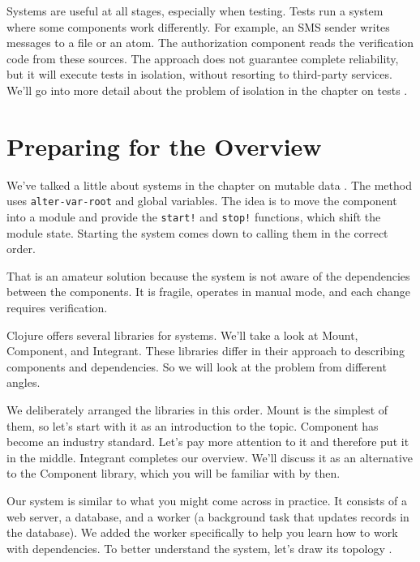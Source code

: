 Systems are useful at all stages, especially when testing. Tests run a system where some components work differently. For example, an SMS sender writes messages to a file or an atom. The authorization component reads the verification code from these sources. The approach does not guarantee complete reliability, but it will execute tests in isolation, without resorting to third-party services. We'll go into more detail about the problem of isolation in the chapter on tests .

\section{Preparing for the Overview}


We've talked a little about systems in the chapter on mutable data . The method uses \verb|alter-var-root| and global variables. The idea is to move the component into a module and provide the \verb|start!| and \verb|stop!| functions, which shift the module state. Starting the system comes down to calling them in the correct order.

That is an amateur solution because the system is not aware of the dependencies between the components. It is fragile, operates in manual mode, and each change requires verification.

Clojure offers several libraries for systems. We'll take a look at Mount, Component, and Integrant. These libraries differ in their approach to describing components and dependencies. So we will look at the problem from different angles.

We deliberately arranged the libraries in this order. Mount is the simplest of them, so let's start with it as an introduction to the topic. Component has become an industry standard. Let's pay more attention to it and therefore put it in the middle. Integrant completes our overview. We'll discuss it as an alternative to the Component library, which you will be familiar with by then.

Our system is similar to what you might come across in practice. It consists of a web server, a database, and a worker (a background task that updates records in the database). We added the worker specifically to help you learn how to work with dependencies. To better understand the system, let's draw its topology .

\label{demo-system}

